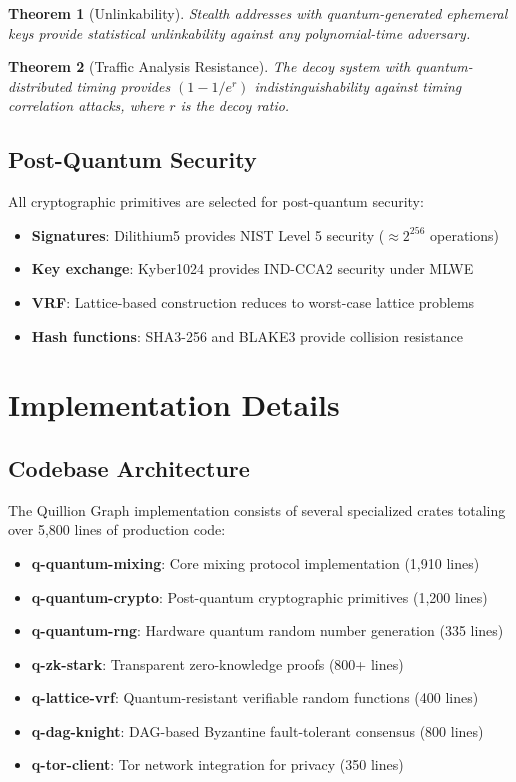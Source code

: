 \documentclass[12pt,a4paper]{article}
\newtheorem{theorem}{Theorem}[section]
\begin{document}
\begin{theorem}[Unlinkability]
Stealth addresses with quantum-generated ephemeral keys provide statistical unlinkability against any polynomial-time adversary.
\end{theorem}

\begin{theorem}[Traffic Analysis Resistance]
The decoy system with quantum-distributed timing provides $(1-1/e^{r})$ indistinguishability against timing correlation attacks, where $r$ is the decoy ratio.
\end{theorem}

\subsection{Post-Quantum Security}

All cryptographic primitives are selected for post-quantum security:

\begin{itemize}
\item \textbf{Signatures}: Dilithium5 provides NIST Level 5 security ($\approx 2^{256}$ operations)
\item \textbf{Key exchange}: Kyber1024 provides IND-CCA2 security under MLWE
\item \textbf{VRF}: Lattice-based construction reduces to worst-case lattice problems
\item \textbf{Hash functions}: SHA3-256 and BLAKE3 provide collision resistance
\end{itemize}

\section{Implementation Details}

\subsection{Codebase Architecture}

The Quillion Graph implementation consists of several specialized crates totaling over 5,800 lines of production code:

\begin{itemize}
\item \textbf{q-quantum-mixing}: Core mixing protocol implementation (1,910 lines)
\item \textbf{q-quantum-crypto}: Post-quantum cryptographic primitives (1,200 lines)
\item \textbf{q-quantum-rng}: Hardware quantum random number generation (335 lines)
\item \textbf{q-zk-stark}: Transparent zero-knowledge proofs (800+ lines)
\item \textbf{q-lattice-vrf}: Quantum-resistant verifiable random functions (400 lines)
\item \textbf{q-dag-knight}: DAG-based Byzantine fault-tolerant consensus (800 lines)
\item \textbf{q-tor-client}: Tor network integration for privacy (350 lines)
\end{itemize}
\end{document}
